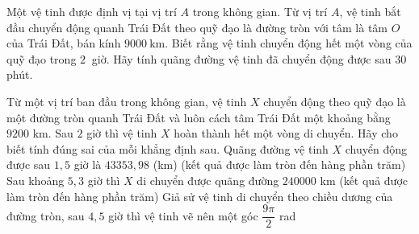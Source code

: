 \begin{bt}%

	Một vệ tinh được định vị tại vị trí $A$ trong không gian. Từ vị trí $A$, vệ tinh bắt đầu chuyển động quanh Trái Đất theo quỹ đạo là đường tròn với tâm là tâm $O$ của Trái Đất, bán kính $9000 \mathrm{~km}$. Biết rằng vệ tinh chuyển động hết một vòng của quỹ đạo trong $2~$ giờ. Hãy tính quãng đường vệ tinh đã chuyển động được sau $30$ phút.
\end{bt}

\begin{ex}%

	Từ một vị trí ban đầu trong không gian, vệ tinh $X$ chuyển động theo quỹ đạo là một đường tròn quanh Trái Đất và luôn cách tâm Trái Đất một khoảng bằng $9200$ km. Sau $2$ giờ thì vệ tinh $X$ hoàn thành hết một vòng di chuyển. Hãy cho biết tính đúng sai của mỗi khẳng định sau.
	{\True Quãng đường vệ tinh $X$ chuyển động được sau $1{,}5$ giờ là $43353{,}98$ (km) (kết quả được làm tròn đến hàng phần trăm)}
	{Sau khoảng $5{,}3$ giờ thì $X$ di chuyển được quãng đường $240000$ km (kết quả được làm tròn đến hàng phần trăm)}
	{\True Giả sử vệ tinh di chuyển theo chiều dương của đường tròn, sau $4{,}5$ giờ thì vệ tinh vẽ nên một góc $\dfrac{9\pi}{2}$ rad}
\end{ex}

